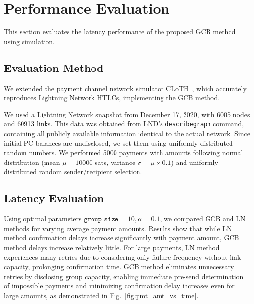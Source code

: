 \documentclass[conference]{IEEEtran}
\newcommand{\groupsize}{\texttt{group\_size}}
\begin{document}
\section{Performance Evaluation}

This section evaluates the latency performance of the proposed GCB method using simulation.

\subsection{Evaluation Method}

We extended the payment channel network simulator CLoTH~\cite{CONOSCENTI2021100717}, which accurately reproduces Lightning Network HTLCs, implementing the GCB method.

We used a Lightning Network snapshot from December 17, 2020, with 6005 nodes and 60913 links.
This data was obtained from LND's \texttt{describegraph} command, containing all publicly available information identical to the actual network.
Since initial PC balances are undisclosed, we set them using uniformly distributed random numbers.
We performed 5000 payments with amounts following normal distribution (mean $\mu = 10000$ sats, variance $\sigma = \mu \times 0.1$) and uniformly distributed random sender/recipient selection.

\subsection{Latency Evaluation}

Using optimal parameters $\groupsize=10, \alpha=0.1$, we compared GCB and LN methods for varying average payment amounts.
Results show that while LN method confirmation delays increase significantly with payment amount, GCB method delays increase relatively little.
For large payments, LN method experiences many retries due to considering only failure frequency without link capacity, prolonging confirmation time.
GCB method eliminates unnecessary retries by disclosing group capacity, enabling immediate pre-send determination of impossible payments and minimizing confirmation delay increases even for large amounts, as demonstrated in Fig.~\ref{fig:pmt_amt_vs_time}.
\end{document}
